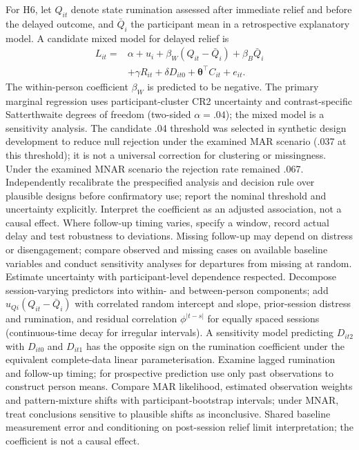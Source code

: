 \documentclass[11pt,a4paper]{article}
\begin{document}
For H6, let $Q_{it}$ denote state rumination assessed after immediate relief and before the delayed outcome, and $\bar Q_i$ the participant mean in a retrospective explanatory model. A candidate mixed model for delayed relief is
\begin{align}
L_{it}={}&\alpha+u_i+\beta_W(Q_{it}-\bar Q_i)+\beta_B\bar Q_i\nonumber\\
&+\gamma R_{it}+\delta D_{it0}+\boldsymbol{\theta}^{\top}C_{it}+e_{it}.
\end{align}
The within-person coefficient $\beta_W$ is predicted to be negative. The primary marginal regression uses participant-cluster CR2 uncertainty and contrast-specific Satterthwaite degrees of freedom (two-sided $\alpha=.04$); the mixed model is a sensitivity analysis. The candidate .04 threshold was selected in synthetic design development to reduce null rejection under the examined MAR scenario (.037 at this threshold); it is not a universal correction for clustering or missingness. Under the examined MNAR scenario the rejection rate remained .067. Independently recalibrate the prespecified analysis and decision rule over plausible designs before confirmatory use; report the nominal threshold and uncertainty explicitly. Interpret the coefficient as an adjusted association, not a causal effect. Where follow-up timing varies, specify a window, record actual delay and test robustness to deviations. Missing follow-up may depend on distress or disengagement; compare observed and missing cases on available baseline variables and conduct sensitivity analyses for departures from missing at random. Estimate uncertainty with participant-level dependence respected. Decompose session-varying predictors into within- and between-person components; add $u_{Qi}(Q_{it}-\bar Q_i)$ with correlated random intercept and slope, prior-session distress and rumination, and residual correlation $\phi^{|t-s|}$ for equally spaced sessions (continuous-time decay for irregular intervals). A sensitivity model predicting $D_{it2}$ with $D_{it0}$ and $D_{it1}$ has the opposite sign on the rumination coefficient under the equivalent complete-data linear parameterisation. Examine lagged rumination and follow-up timing; for prospective prediction use only past observations to construct person means. Compare MAR likelihood, estimated observation weights and pattern-mixture shifts with participant-bootstrap intervals; under MNAR, treat conclusions sensitive to plausible shifts as inconclusive. Shared baseline measurement error and conditioning on post-session relief limit interpretation; the coefficient is not a causal effect.
\end{document}
